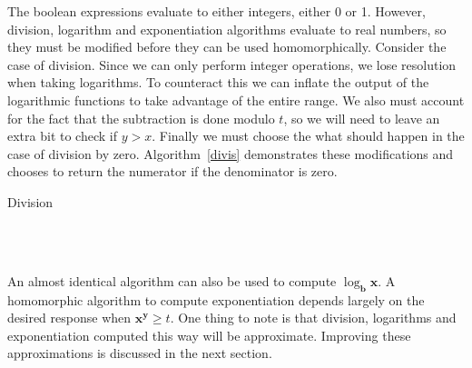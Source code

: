 \documentclass{article}
\begin{document}
        The boolean expressions evaluate to either integers, either 0 or 1.
        However, division, logarithm and exponentiation algorithms 
        evaluate to real numbers, so they must be modified before they can be
        used homomorphically. 
        Consider the case of division. 
        Since we can only perform integer operations, we lose resolution when taking logarithms.
        To counteract this we can inflate the output of the logarithmic functions
        to take advantage of the entire range.
        We also must account for the fact that the subtraction is done modulo $t$, 
        so we will need to leave an extra bit to check if $y > x$.
        Finally we must choose the what should happen in the case of division by zero.
        Algorithm~\ref{divis} demonstrates these modifications and chooses to return the numerator if the denominator is zero.

    \begin{algorithm}
        \caption{Division}\label{divis}
        \begin{algorithmic}
                    \State{}
                \Else%
                    \State{}
                \EndIf%
            \EndFunction%
            \\
                    \State{}
                \Else%
                    \State{}
                \EndIf%
            \EndFunction%
            \\
                \State{}
            \EndFunction%
        \end{algorithmic}
    \end{algorithm}
        An almost identical algorithm can also be used to compute $\log_\mathbf{b}\mathbf{x}$.
        A homomorphic algorithm to compute exponentiation depends largely on the desired response when $\mathbf{x}^\mathbf{y} \geq t$.
        One thing to note is that division, logarithms and exponentiation computed this way will be approximate. Improving these approximations is discussed in the next section.
        
\end{document}
